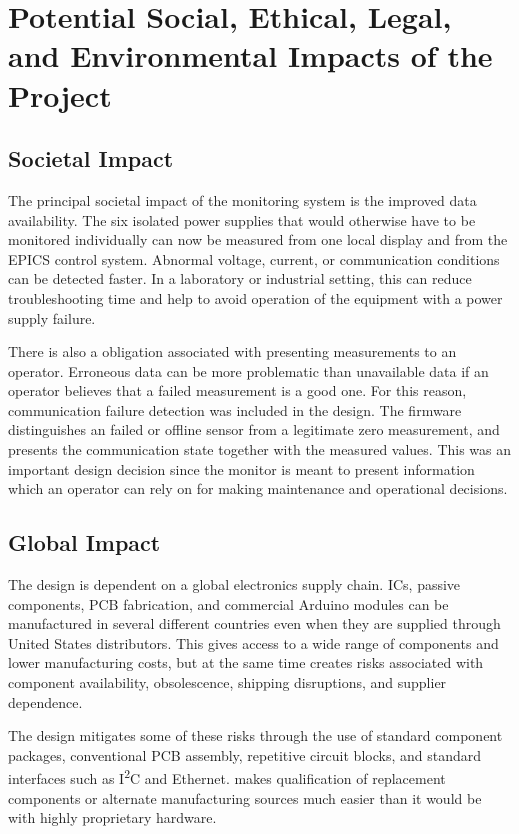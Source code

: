 \chapter{Potential Social, Ethical, Legal, and Environmental Impacts of the Project}
\label{ch:impacts}

\section{Societal Impact}

The principal societal impact of the monitoring system is the improved data availability. The six isolated power supplies that would otherwise have to be monitored individually can now be measured from one local display and from the EPICS
control system. Abnormal voltage, current, or communication conditions can be detected faster. In a laboratory or industrial setting, this can reduce troubleshooting time and help to avoid operation of the equipment with a power supply failure.

There is also a obligation associated with presenting measurements to an
operator. Erroneous data can be more problematic than unavailable data if an operator
believes that a failed measurement is a good one. For this reason, communication failure
detection was included in the design. The firmware distinguishes an failed or
offline sensor from a legitimate zero measurement, and presents the communication state together with the measured values. This was an important design decision
since the monitor is meant to present information which an operator can rely on for making maintenance and operational decisions.

\section{Global Impact}

The design is dependent on a global electronics supply chain. ICs, passive components, PCB fabrication, and commercial Arduino modules can be manufactured in several different countries even when they are supplied through United States distributors. This gives access to a wide range of
components and lower manufacturing costs, but at the same time creates risks associated with component availability, obsolescence, shipping disruptions, and
supplier dependence.

The design mitigates some of these risks through the use of standard component
packages, conventional PCB assembly, repetitive circuit blocks, and standard interfaces such as I\textsuperscript{2}C and Ethernet. makes qualification of replacement components or alternate manufacturing sources much easier than it would be with highly proprietary hardware.

